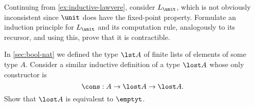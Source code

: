 \begin{ex}\label{ex:ilunit}
  Continuing from \autoref{ex:inductive-lawvere}, consider $L_\unit$, which is not obviously inconsistent since $\unit$ does have the fixed-point property.
  Formulate an induction principle for $L_\unit$ and its computation rule, analogously to its recursor, and using this, prove that it is contractible.
\end{ex}

\begin{ex}\label{ex:empty-inductive-type}
In \autoref{sec:bool-nat} we defined the type $\lst A$ of finite lists of elements of some type $A$.
Consider a similar inductive definition of a type $\lost A$ whose only constructor is
\[ \cons: A \to \lost A \to \lost A. \]
Show that $\lost A$ is equivalent to $\emptyt$.
\end{ex}


